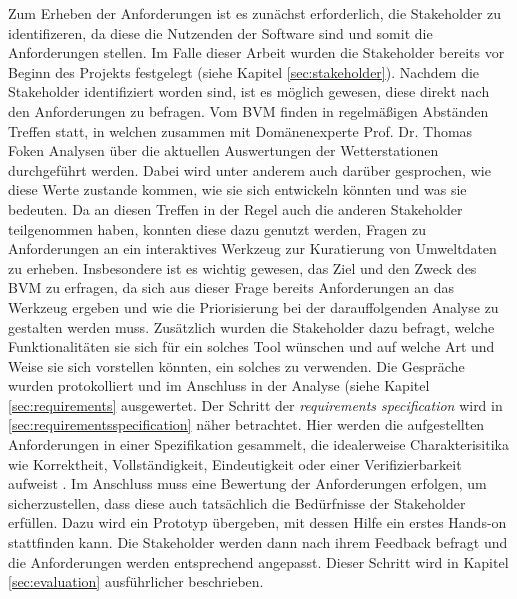 Zum Erheben der Anforderungen ist es zunächst erforderlich, die Stakeholder zu identifizeren, da diese 
die Nutzenden der Software sind und somit die Anforderungen stellen. Im Falle dieser Arbeit wurden die Stakeholder bereits vor Beginn des Projekts festgelegt (siehe Kapitel \ref{sec:stakeholder}). Nachdem die Stakeholder identifiziert worden sind, ist es möglich gewesen, 
diese direkt nach den Anforderungen zu befragen. Vom \ac{BVM} finden in regelmäßigen Abständen Treffen statt, in welchen zusammen mit Domänenexperte Prof. Dr. Thomas Foken Analysen über die aktuellen Auswertungen der Wetterstationen durchgeführt werden. Dabei wird unter anderem 
auch darüber gesprochen, wie diese Werte zustande kommen, wie sie sich entwickeln könnten und was sie bedeuten. Da an diesen Treffen in der Regel auch die anderen Stakeholder teilgenommen haben, konnten diese dazu genutzt werden, Fragen zu Anforderungen an ein interaktives Werkzeug 
zur Kuratierung von Umweltdaten zu erheben. Insbesondere ist es wichtig gewesen, das Ziel und den Zweck des \ac{BVM} zu erfragen, da sich aus dieser Frage bereits Anforderungen an das Werkzeug ergeben und wie die Priorisierung bei der darauffolgenden Analyse zu gestalten werden muss. Zusätzlich wurden die Stakeholder dazu befragt, welche Funktionalitäten 
sie sich für ein solches Tool wünschen und auf welche Art und Weise sie sich vorstellen könnten, ein solches zu verwenden. Die Gespräche wurden protokolliert und im Anschluss in der Analyse (siehe Kapitel \ref{sec:requirements} ausgewertet. Der Schritt der \textit{requirements specification} wird in \ref{sec:requirementsspecification} näher betrachtet. Hier 
werden die aufgestellten Anforderungen in einer Spezifikation gesammelt, die idealerweise Charakterisitika wie Korrektheit, Vollständigkeit, Eindeutigkeit oder einer Verifizierbarkeit aufweist \cite{institute1984ieee}. Im Anschluss muss eine Bewertung der Anforderungen erfolgen, um sicherzustellen, dass diese auch tatsächlich die Bedürfnisse der Stakeholder erfüllen. 
Dazu wird ein Prototyp übergeben, mit dessen Hilfe ein erstes Hands-on stattfinden kann. Die Stakeholder werden dann nach ihrem Feedback befragt und die Anforderungen werden entsprechend angepasst. Dieser Schritt wird in Kapitel \ref{sec:evaluation} ausführlicher beschrieben.

